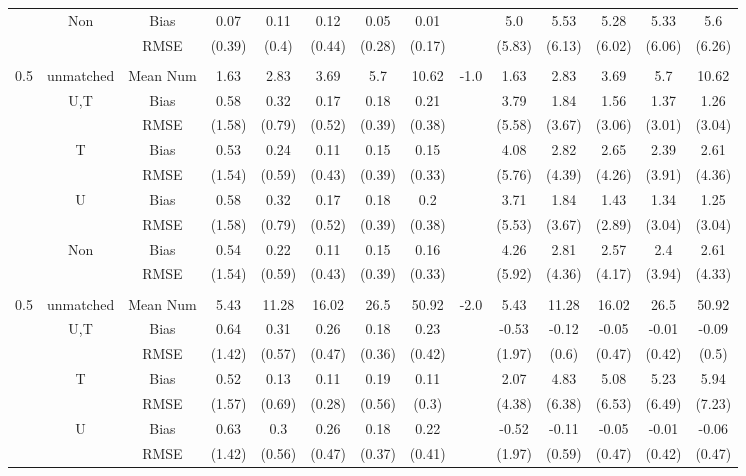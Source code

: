 \begin{tabular}{@{\extracolsep{5pt}}lc|cccccc|lccccc}
 & Non & Bias & 0.07 & 0.11 & 0.12 & 0.05 & 0.01 &  & 5.0 & 5.53 & 5.28 & 5.33 & 5.6 \\
 &  & RMSE & (0.39) & (0.4) & (0.44) & (0.28) & (0.17) &  & (5.83) & (6.13) & (6.02) & (6.06) & (6.26) \\
 &  &  &  &  &  &  &  &  &  &  &  &  &  \\
0.5 & unmatched & Mean Num & 1.63 & 2.83 & 3.69 & 5.7 & 10.62 & -1.0 & 1.63 & 2.83 & 3.69 & 5.7 & 10.62 \\
 & U,T & Bias & 0.58 & 0.32 & 0.17 & 0.18 & 0.21 &  & 3.79 & 1.84 & 1.56 & 1.37 & 1.26 \\
 &  & RMSE & (1.58) & (0.79) & (0.52) & (0.39) & (0.38) &  & (5.58) & (3.67) & (3.06) & (3.01) & (3.04) \\
 & T & Bias & 0.53 & 0.24 & 0.11 & 0.15 & 0.15 &  & 4.08 & 2.82 & 2.65 & 2.39 & 2.61 \\
 &  & RMSE & (1.54) & (0.59) & (0.43) & (0.39) & (0.33) &  & (5.76) & (4.39) & (4.26) & (3.91) & (4.36) \\
 & U & Bias & 0.58 & 0.32 & 0.17 & 0.18 & 0.2 &  & 3.71 & 1.84 & 1.43 & 1.34 & 1.25 \\
 &  & RMSE & (1.58) & (0.79) & (0.52) & (0.39) & (0.38) &  & (5.53) & (3.67) & (2.89) & (3.04) & (3.04) \\
 & Non & Bias & 0.54 & 0.22 & 0.11 & 0.15 & 0.16 &  & 4.26 & 2.81 & 2.57 & 2.4 & 2.61 \\
 &  & RMSE & (1.54) & (0.59) & (0.43) & (0.39) & (0.33) &  & (5.92) & (4.36) & (4.17) & (3.94) & (4.33) \\
 &  &  &  &  &  &  &  &  &  &  &  &  &  \\
0.5 & unmatched & Mean Num & 5.43 & 11.28 & 16.02 & 26.5 & 50.92 & -2.0 & 5.43 & 11.28 & 16.02 & 26.5 & 50.92 \\
 & U,T & Bias & 0.64 & 0.31 & 0.26 & 0.18 & 0.23 &  & -0.53 & -0.12 & -0.05 & -0.01 & -0.09 \\
 &  & RMSE & (1.42) & (0.57) & (0.47) & (0.36) & (0.42) &  & (1.97) & (0.6) & (0.47) & (0.42) & (0.5) \\
 & T & Bias & 0.52 & 0.13 & 0.11 & 0.19 & 0.11 &  & 2.07 & 4.83 & 5.08 & 5.23 & 5.94 \\
 &  & RMSE & (1.57) & (0.69) & (0.28) & (0.56) & (0.3) &  & (4.38) & (6.38) & (6.53) & (6.49) & (7.23) \\
 & U & Bias & 0.63 & 0.3 & 0.26 & 0.18 & 0.22 &  & -0.52 & -0.11 & -0.05 & -0.01 & -0.06 \\
 &  & RMSE & (1.42) & (0.56) & (0.47) & (0.37) & (0.41) &  & (1.97) & (0.59) & (0.47) & (0.42) & (0.47) \\

\end{tabular}

